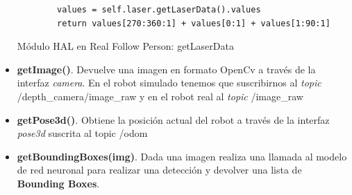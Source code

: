 \begin{itemize}
\begin{code}[H]
\begin{lstlisting}
		values = self.laser.getLaserData().values
		return values[270:360:1] + values[0:1] + values[1:90:1]
	\end{lstlisting}
	\caption{Módulo HAL en Real Follow Person: getLaserData}
	\label{cod:real_follow_person_hal_laser}
\end{code}
	\item \textbf{getImage()}. Devuelve una imagen en formato OpenCv a través de la interfaz \textit{camera}. En el robot simulado tenemos que suscribirnos al \textit{topic} /depth\_camera/image\_raw y en el robot real al \textit{topic} /image\_raw
	\item \textbf{getPose3d()}. Obtiene la posición actual del robot a través de la interfaz \textit{pose3d} suscrita al topic /odom
	\item \textbf{getBoundingBoxes(img)}. Dada una imagen realiza una llamada al modelo de red neuronal para realizar una detección y devolver una lista de \textbf{Bounding Boxes}.  
\end{itemize}\



